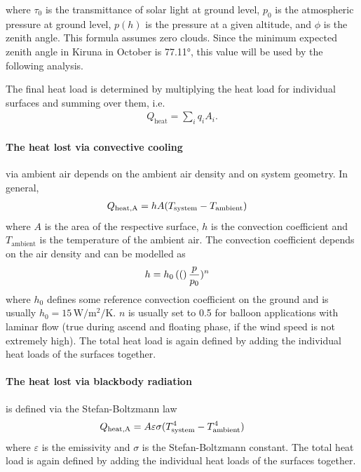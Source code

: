 where $\tau_0$ is the transmittance of solar light at ground level, $p_0$ is the atmospheric pressure at ground level, $p(h)$ is the pressure at a given altitude, and $\phi$ is the zenith angle. This formula assumes zero clouds. Since the minimum expected zenith angle in Kiruna in October is 77.11°, this value will be used by the following analysis.\par 
The final heat load is determined by multiplying the heat load for individual surfaces and summing over them, i.e.
\begin{align}
    Q_\mathrm{heat}=\sum_i q_i A_i.
\end{align}

\paragraph{The heat lost via convective cooling} via ambient air depends on the ambient air density and on system geometry. In general, 
\begin{align}
    Q_\mathrm{heat,A} = hA(T_\mathrm{system}-T_\mathrm{ambient})\quad
\end{align}
where $A$ is the area of the respective surface, $h$ is the convection coefficient and $T_\mathrm{ambient}$ is the temperature of the ambient air. The convection coefficient depends on the air density and can be modelled as 
\begin{align}
    h = h_0 \left( ( \right)\frac{p}{p_0})^n\quad
\end{align}
where $h_0$ defines some reference convection coefficient on the ground and is usually $h_0=15\,\mathrm{W/m^2/K}$. 
$n$ is usually set to 0.5 for balloon applications with laminar flow (true during ascend and floating phase, if the wind speed is not extremely high). The total heat load is again defined by adding the individual heat loads of the surfaces together.

\paragraph{The heat lost via blackbody radiation} is defined via the Stefan-Boltzmann law 
\begin{align}
    Q_\mathrm{heat,A}&= A\varepsilon\sigma (T_\mathrm{system}^4-T_\mathrm{ambient}^4)\quad
\end{align}
where $\varepsilon$ is the emissivity and $\sigma$ is the Stefan-Boltzmann constant. The total heat load is again defined by adding the individual heat loads of the surfaces together.

